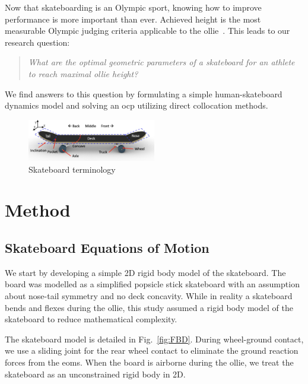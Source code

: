 \documentclass[default,iicol]{sn-jnl}
\begin{document}
Now that skateboarding is an Olympic sport, knowing how to improve performance is more important than ever.
Achieved height is the most measurable Olympic judging criteria applicable to the ollie~\cite{world_skate_skateboarding_2021}.
This leads to our research question:
\begin{quote}
\textit{
    What are the optimal geometric parameters of a skateboard for an athlete to reach maximal ollie height?}
\end{quote}
We find answers to this question by formulating a simple human-skateboard dynamics model and solving an \gls{ocp} utilizing direct collocation methods.

\begin{figure}[t]
    \includegraphics[width=0.5\textwidth]{figure/Fig2.png}
    \caption[Skateboard terminology]{Skateboard terminology}
    \label{fig:skateboard terminology}
\end{figure}

\section{Method}

\subsection{Skateboard Equations of Motion}
We start by developing a simple 2D rigid body model of the skateboard.
The board was modelled as a simplified popsicle stick skateboard with an assumption about nose-tail symmetry and no deck concavity.
While in reality a skateboard bends and flexes during the ollie, this study assumed a rigid body model of the skateboard to reduce mathematical complexity.

The skateboard model is detailed in Fig.~\ref{fig:FBD}. During wheel-ground contact, we use a sliding joint for the rear wheel contact to eliminate the ground reaction forces from the \glspl{eom}.
When the board is airborne during the ollie, we treat the skateboard as an unconstrained rigid body in 2D. 
\end{document}
